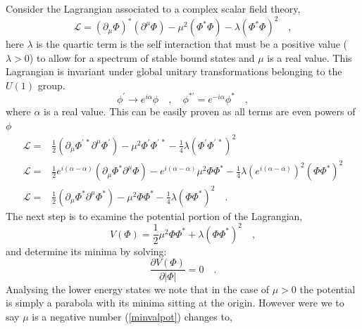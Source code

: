 \documentclass[12pt]{article}
\begin{document}
Consider the Lagrangian associated to a complex scalar field theory, 
%
\begin{equation}
\mathcal{L} =(\partial_\mu \Phi)^* ( \partial^\mu \Phi) -  \mu^2 (\Phi^* \Phi) - \lambda (\Phi^* \Phi)^2 \quad , 
\label{l4}
\end{equation}
%
%
here $\lambda$ is the quartic term is the self interaction that must be a positive value ($\lambda > 0$) to allow for a spectrum of stable bound states and $\mu$ is a real value.
%
This Lagrangian is invariant under global unitary transformations belonging to the $U(1)$ group.
%
\begin{equation}
\phi^\prime \rightarrow e^{i\alpha} \phi \quad  , \quad \phi^{* \prime}=e^{-i \alpha} \phi^* \quad ,
\label{global}
\end{equation} 
%
where $\alpha$ is a real value. This can be easily proven as all terms are even powers of $\phi$
%
\begin{align}
\mathcal{L} =& \frac{1}{2}(\partial_\mu \Phi^{\prime \, *} \partial^\mu \Phi^{\prime} ) -  \mu^2 \Phi^\prime \Phi^{\prime \, *} - \frac{1}{4} \lambda (\Phi^\prime \Phi^{\prime \, *})^2 \nonumber	\\
\mathcal{L} =& \frac{1}{2}e^{i(\alpha-\alpha)}(\partial_\mu \Phi^{*} \partial^\mu \Phi ) -  e^{i(\alpha-\alpha)} \mu^2 \Phi \Phi^* - \frac{1}{4} \lambda (e^{i(\alpha-\alpha)})^2(\Phi \Phi^{*})^2	\\
\mathcal{L} =& \frac{1}{2}(\partial_\mu \Phi^{*} \partial^\mu \Phi^{*} ) - \mu^2 \Phi \Phi^* - \frac{1}{4} \lambda (\Phi \Phi^{*})^2	 \quad . \nonumber 
\end{align} 
%
The next step is to examine the potential portion of the Lagrangian, 
%
\begin{equation}
V(\Phi)=  \frac{1}{2} \mu^2 \Phi \Phi^* + \lambda (\Phi \Phi^{*})^2 \quad , 
\end{equation}
%
and determine its minima by solving:
\begin{equation}
\frac{\partial V(\Phi)}{\partial | \Phi | } = 0  \quad .
\label{minvalpot}
\end{equation}
%
Analysing the lower energy states we note that in the case of $\mu > 0$ the potential is simply a parabola with its minima sitting at the origin.
%
However were we to say $\mu$ is a negative number (\ref{minvalpot}) changes to,	
%
\end{document}
